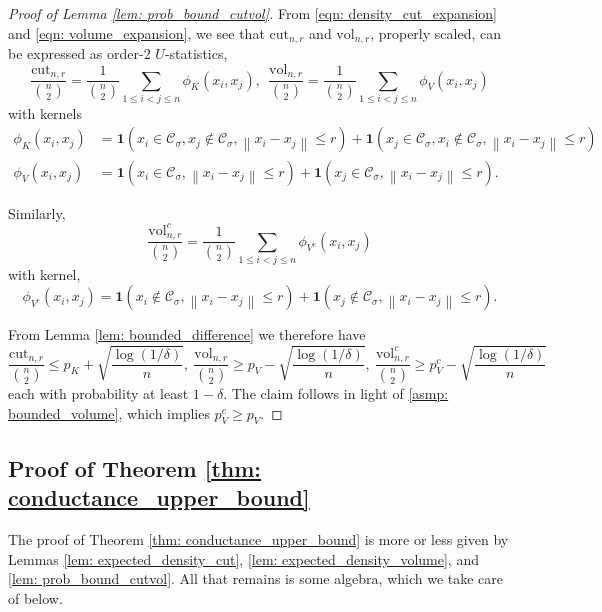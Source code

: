 \documentclass{article}
\newcommand{\vol}{\mathrm{vol}}
\newcommand{\cut}{\mathrm{cut}}
\newcommand{\norm}[1]{\left\lVert#1\right\rVert}
\newcommand{\1}{\mathbf{1}}
\newcommand{\Cset}{\mathcal{C}}
\newcommand{\Csig}{\Cset_{\sigma}}
\theoremstyle{aldenthm}
\theoremstyle{aldenrmrk}
\begin{document}
\begin{proof}[Proof of Lemma \ref{lem: prob_bound_cutvol}]
	From \eqref{eqn: density_cut_expansion} and \eqref{eqn: volume_expansion}, we see that $\cut_{n,r}$ and $\vol_{n,r}$, properly scaled, can be expressed as order-$2$ $U$-statistics,
	\begin{equation*}
	\frac{\cut_{n,r}}{{n \choose 2}} = \frac{1}{{n \choose 2}} \sum_{1 \leq i < j \leq n} \phi_K(x_i, x_j),~~ \frac{\vol_{n,r}}{{n \choose 2}} = \frac{1}{{n \choose 2}} \sum_{1 \leq i < j \leq n} \phi_V(x_i, x_j)
	\end{equation*}
	with kernels
	\begin{align*}
	\phi_K(x_i,x_j) & = \1(x_i \in \Csig, x_j \not\in \Csig, \norm{x_i - x_j} \leq r) + \1(x_j \in \Csig, x_i \not\in \Csig, \norm{x_i - x_j} \leq r) \\
	\phi_V(x_i,x_j) & = \1(x_i \in \Csig, \norm{x_i - x_j} \leq r) + \1(x_j \in \Csig, \norm{x_i - x_j} \leq r). 
	\end{align*}
	
	Similarly,
	\begin{equation*}
	\frac{\vol_{n,r}^c}{{n \choose 2}} = \frac{1}{{n \choose 2}} \sum_{1 \leq i < j \leq n} \phi_{V^c}(x_i, x_j)
	\end{equation*}
	with kernel,
	\begin{equation*}
	\phi_{V^c}(x_i,x_j) = \1(x_i \not\in \Csig, \norm{x_i - x_j} \leq r) + \1(x_j \not\in \Csig, \norm{x_i - x_j} \leq r). 
	\end{equation*}
	
	From Lemma \ref{lem: bounded_difference} we therefore have
	\begin{equation*}
	\frac{\cut_{n,r}}{{n \choose 2}} \leq p_K + \sqrt{\frac{\log(1/\delta)}{n}},~  \frac{\vol_{n,r}}{{n \choose 2}} \geq p_V - \sqrt{\frac{\log(1/\delta)}{n}}, ~ \frac{\vol_{n,r}^c}{{n \choose 2}} \geq p_V^c - \sqrt{\frac{\log(1/\delta)}{n}}
	\end{equation*}
	each with probability at least $1 - \delta$. The claim follows in light of \ref{asmp: bounded_volume}, which implies $p_V^c \geq p_V$. 
\end{proof}

\subsection{Proof of Theorem \ref{thm: conductance_upper_bound}}
\label{sec: proof_of_theorem_1}

The proof of Theorem \ref{thm: conductance_upper_bound} is more or less given by Lemmas \ref{lem: expected_density_cut}, \ref{lem: expected_density_volume}, and \ref{lem: prob_bound_cutvol}. All that remains is some algebra, which we take care of below.
\end{document}
